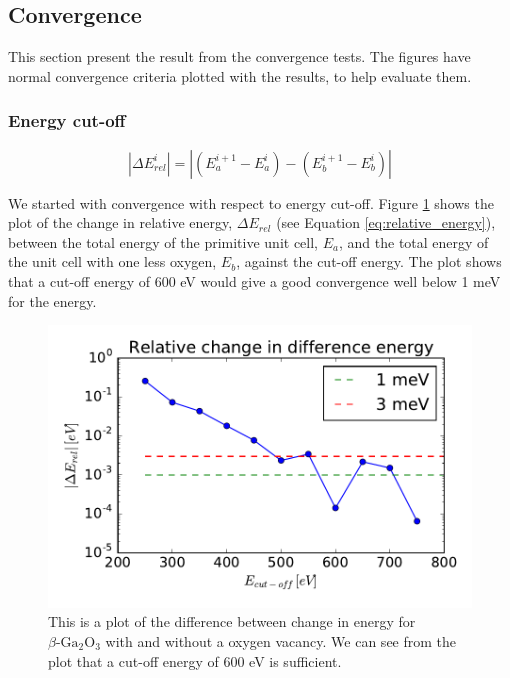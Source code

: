 \subsection{Convergence}

This section present the result from the convergence tests. The figures have normal convergence criteria plotted with the results, to help evaluate them. 

\subsubsection{Energy cut-off}

\begin{equation}\label{eq:relative_energy}
|\Delta E_{rel}^i| =\left| \left( E_a^{i+1}-E_a^i\right)-\left( E_b^{i+1}-E_b^i\right)\right|
\end{equation}

We started with convergence with respect to energy cut-off. Figure \ref{fig:totencutoff} shows the plot of the change in relative energy, $\Delta E_{rel}$ (see Equation \ref{eq:relative_energy}), between the total energy of the primitive unit cell, $E_a$, and the total energy of the unit cell with one less oxygen, $E_b$, against the cut-off energy. The plot shows that a cut-off energy of 600 eV would give a good convergence well below 1 meV for the energy.

\begin{figure}[H]
\includegraphics[width=\linewidth]{../fig/deltatotencurverel.pdf}\caption{This is a plot of the difference between change in energy for $\beta \text{-Ga}_2\text{O}_3$ with and without a oxygen vacancy. We can see from the plot that a cut-off energy of 600 eV is sufficient.}\label{fig:totencutoff}
\end{figure}

